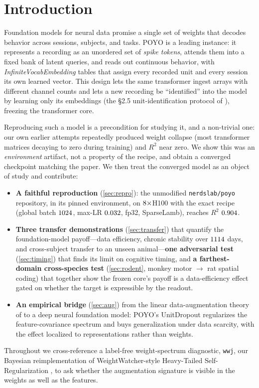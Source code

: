 \documentclass{article} %
\newcommand{\poyo}{POYO\xspace}
\newcommand{\wwj}{\texttt{wwj}\xspace}
\newcommand{\rtwo}{$R^2$\xspace}
\begin{document}
\section{Introduction}
\label{sec:intro}
Foundation models for neural data promise a single set of weights that decodes behavior
across sessions, subjects, and tasks. \poyo \citep{azabou2023poyo} is a leading
instance: it represents a recording as an unordered set of \emph{spike tokens}, attends them
into a fixed bank of latent queries, and reads out continuous behavior, with
\emph{InfiniteVocabEmbedding} tables that assign every recorded unit and every session its
own learned vector. This design lets the same transformer ingest arrays with different
channel counts and lets a new recording be ``identified'' into the model by learning only
its embeddings (the \S2.5 unit-identification protocol of \citealp{azabou2023poyo}), freezing
the transformer core.

Reproducing such a model is a precondition for studying it, and a non-trivial one: our own
earlier attempts repeatedly produced weight collapse (most transformer matrices decaying to
zero during training) and \rtwo{} near zero. We show this was an \emph{environment} artifact,
not a property of the recipe, and obtain a converged checkpoint matching the paper.
We then treat the converged model as an object of study and contribute:
\begin{itemize}
\item \textbf{A faithful reproduction} (\cref{sec:repro}): the unmodified \texttt{nerdslab/poyo}
repository, in its pinned environment, on $8\times$H100 with the exact recipe
(global batch $1024$, max-LR $0.032$, fp32, SparseLamb), reaches \rtwo{}
$0.904$.
\item \textbf{Three transfer demonstrations} (\cref{sec:transfer}) that quantify the
foundation-model payoff---data efficiency, chronic stability over $1114$ days, and
cross-subject transfer to an unseen animal---\textbf{one adversarial test}
(\cref{sec:timing}) that finds its limit on cognitive timing, and \textbf{a farthest-domain
cross-species test} (\cref{sec:rodent}, monkey motor $\to$ rat spatial coding) that together
show the frozen core's payoff is a data-efficiency effect gated on whether the target is
expressible by the readout.
\item \textbf{An empirical bridge} (\cref{sec:aug}) from the linear data-augmentation theory
of \citet{lin2024augmentation} to a deep neural foundation model: \poyo's UnitDropout
regularizes the feature-covariance spectrum and buys generalization under data scarcity,
with the effect localized to representations rather than weights.
\end{itemize}
Throughout we cross-reference a label-free weight-spectrum diagnostic, \wwj, our Bayesian
reimplementation of WeightWatcher-style Heavy-Tailed Self-Regularization
\citep{martin2021implicit,martin2021predicting}, to ask whether the augmentation signature is
visible in the weights as well as the features.
\end{document}

